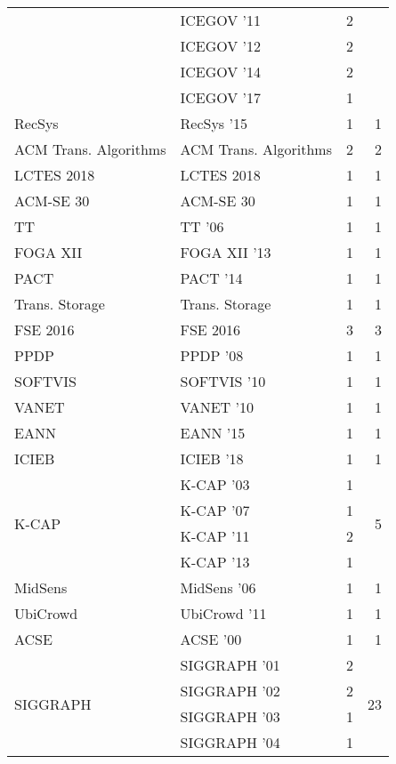 \begin{table*}[t]
\begin{tabular}{llrr}
& ICEGOV '11 & 2 &\\
& ICEGOV '12 & 2 &\\
& ICEGOV '14 & 2 &\\
& ICEGOV '17 & 1 &\\
\multirow{1}{*}{RecSys } & RecSys '15 & 1 & \multirow{1}{*}{1}\\
\multirow{1}{*}{ACM Trans. Algorithms} & ACM Trans. Algorithms & 2 & \multirow{1}{*}{2}\\
\multirow{1}{*}{LCTES 2018} & LCTES 2018 & 1 & \multirow{1}{*}{1}\\
\multirow{1}{*}{ACM-SE 30} & ACM-SE 30 & 1 & \multirow{1}{*}{1}\\
\multirow{1}{*}{TT } & TT '06 & 1 & \multirow{1}{*}{1}\\
\multirow{1}{*}{FOGA XII } & FOGA XII '13 & 1 & \multirow{1}{*}{1}\\
\multirow{1}{*}{PACT } & PACT '14 & 1 & \multirow{1}{*}{1}\\
\multirow{1}{*}{Trans. Storage} & Trans. Storage & 1 & \multirow{1}{*}{1}\\
\multirow{1}{*}{FSE 2016} & FSE 2016 & 3 & \multirow{1}{*}{3}\\
\multirow{1}{*}{PPDP } & PPDP '08 & 1 & \multirow{1}{*}{1}\\
\multirow{1}{*}{SOFTVIS } & SOFTVIS '10 & 1 & \multirow{1}{*}{1}\\
\multirow{1}{*}{VANET } & VANET '10 & 1 & \multirow{1}{*}{1}\\
\multirow{1}{*}{EANN } & EANN '15 & 1 & \multirow{1}{*}{1}\\
\multirow{1}{*}{ICIEB } & ICIEB '18 & 1 & \multirow{1}{*}{1}\\
\multirow{4}{*}{K-CAP } & K-CAP '03 & 1 & \multirow{4}{*}{5}\\
& K-CAP '07 & 1 &\\
& K-CAP '11 & 2 &\\
& K-CAP '13 & 1 &\\
\multirow{1}{*}{MidSens } & MidSens '06 & 1 & \multirow{1}{*}{1}\\
\multirow{1}{*}{UbiCrowd } & UbiCrowd '11 & 1 & \multirow{1}{*}{1}\\
\multirow{1}{*}{ACSE } & ACSE '00 & 1 & \multirow{1}{*}{1}\\
\multirow{16}{*}{SIGGRAPH } & SIGGRAPH '01 & 2 & \multirow{16}{*}{23}\\
& SIGGRAPH '02 & 2 &\\
& SIGGRAPH '03 & 1 &\\
& SIGGRAPH '04 & 1 &\\

\end{tabular}
\end{table*}

